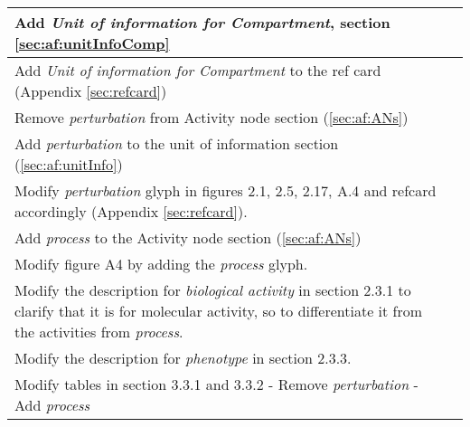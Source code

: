 \newpage
\begin{center}
\label{tab:revision history}
\tablelasttail{\hline}
\begin{supertabular}{|p{12cm}|c|}\hline
Add \emph{Unit of information for Compartment}, section \ref{sec:af:unitInfoComp} & \\\hline
Add \emph{Unit of information for Compartment} to the ref card (Appendix \ref{sec:refcard}) & \\\hline
Remove \emph{perturbation} from Activity node section (\ref{sec:af:ANs}) & \\\hline
Add \emph{perturbation} to the unit of information section (\ref{sec:af:unitInfo}) & \\\hline
Modify \emph{perturbation} glyph in figures 2.1, 2.5, 2.17, A.4 and refcard accordingly (Appendix \ref{sec:refcard}). & \\\hline
Add \emph{process} to the Activity node section (\ref{sec:af:ANs})  & \\\hline
Modify figure A4 by adding the \emph{process} glyph.  & \\\hline
Modify the description for \emph{biological activity} in section 2.3.1 to clarify that it is for molecular activity, so to differentiate it from the activities from \emph{process}.  & \\\hline
Modify the description for \emph{phenotype} in section 2.3.3.  & \\\hline
Modify tables in section 3.3.1 and 3.3.2 
- Remove \emph{perturbation} 
- Add \emph{process} & \\\hline


\end{supertabular}
\end{center}
